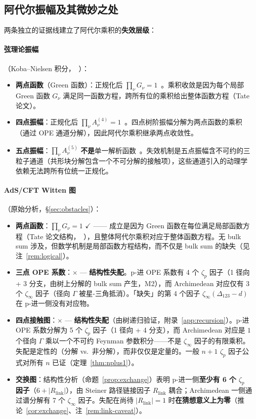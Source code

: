 \documentclass[11pt,a4paper]{ctexart}
\theoremstyle{remark}
\begin{document}
\subsection{阿代尔振幅及其微妙之处}

两条独立的证据线建立了阿代尔乘积的\textbf{失效层级}：

\paragraph{弦理论振幅}（Koba--Nielsen 积分，~\cite{J22}）：
\begin{itemize}[leftmargin=2em]
    \item \textbf{两点函数}（Green 函数）：正规化后 $\prod_\nu G_\nu = 1$~\cite{HSYZ20}。乘积收敛是因为每个局部 Green 函数 $G_\nu$ 满足同一函数方程，跨所有位的乘积给出整体函数方程（Tate 论文）。
    \item \textbf{四点振幅}：正规化后 $\prod_\nu A^{(4)}_\nu = 1$~\cite{J22}。四点树阶振幅分解为两点函数的乘积（通过 OPE 通道分解），因此阿代尔乘积继承两点收敛性。
    \item \textbf{五点振幅}：$\prod_\nu A^{(5)}_\nu$ \textbf{不是}单一解析函数~\cite{J22}。失效机制是五点振幅含不可约的三粒子通道（共形块分解包含一个不可分解的接触项），这些通道引入的动理学依赖无法跨所有位统一正规化。
\end{itemize}

\paragraph{AdS/CFT Witten 图}（原始分析，\S\ref{sec:obstacles}）：
\begin{itemize}[leftmargin=2em]
    \item \textbf{两点函数}：$\prod_\nu G_\nu = 1$ $\checkmark$ —— 成立是因为 Green 函数在每位满足局部函数方程（Tate 论文结构，~\cite{HSYZ20}），且整体阿代尔乘积对应于整体函数方程。无 bulk sum 涉及，但数学机制是局部函数方程结构，而不仅是 bulk sum 的缺失（见注~\ref{rem:logical}）。
    \item \textbf{三点 OPE 系数}：$\times$ --- \textbf{结构性失配}。p-进 OPE 系数有 4 个 $\zeta_p$ 因子（1 径向 + 3 分支，由树上分解的 bulk sum 产生，M2），而 Archimedean 对应仅有 3 个 $\zeta_\infty$ 因子（径向 $\Gamma$ 被星-三角抵消）。「缺失」的第 4 个因子 $\zeta_\infty(\Delta_{123}{-}d)$ 在 p-进一侧没有对应物。
    \item \textbf{四点接触图}：$\times$ --- \textbf{结构性失配}（由树递归验证，附录~\ref{app:recursion}）。p-进 OPE 系数分解为 5 个 $\zeta_p$ 因子（1 径向 + 4 分支），而 Archimedean 对应是 $1$ 个径向 $\Gamma$ 乘以一个不可约 Feynman 参数积分——不是 $\zeta_\infty$ 因子的有限乘积。失配是定性的（分解 vs.\ 非分解），而非仅仅是定量的。一般 $n{+}1$ $\zeta_p$ 因子公式对所有 $n$ 已证（定理~\ref{thm:nplus1}）。
    \item \textbf{交换图}：结构性分析（命题~\ref{prop:exchange}）表明 p-进一侧\textbf{至少有 6 个 $\zeta_p$ 因子}（$6 + |R_{\mathrm{link}}|$），由 Steiner 路径链接因子 $R_{\mathrm{link}}$ 耦合；Archimedean 一侧通过谱分解有 7 个 $\zeta_\infty$ 因子。失配在尚待 $|R_{\mathrm{link}}| = 1$ 时\textbf{在猜想意义上为零}（推论~\ref{cor:exchange}、注~\ref{rem:link-caveat}）。
\end{itemize}
\end{document}
